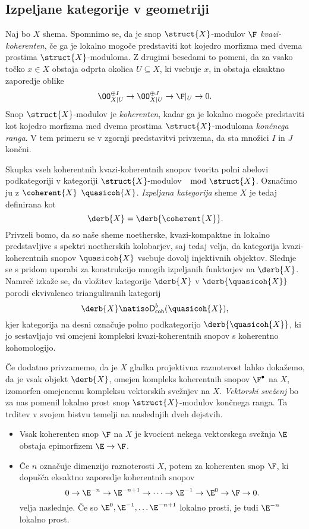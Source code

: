 \subsection*{Izpeljane kategorije v geometriji}

Naj bo $X$ shema. Spomnimo se, da je snop $\struct{X}$-modulov $\F$ \emph{kvazi-koherenten}, če ga je lokalno mogoče predstaviti kot kojedro morfizma med dvema prostima $\struct{X}$-moduloma. Z drugimi besedami to pomeni, da za vsako točko $x \in X$ obstaja odprta okolica $U \subseteq X$, ki vsebuje $x$, in obstaja eksaktno zaporedje oblike 
\[
    \OO_{X|U}^{\oplus I} \to \OO_{X|U}^{\oplus J} \to \F|_U \to 0.
\]
Snop $\struct{X}$-modulov je \emph{koherenten}, kadar ga je lokalno mogoče predstaviti kot kojedro morfizma med dvema prostima $\struct{X}$-moduloma \emph{končnega ranga}. V tem primeru se v zgornji predstavitvi privzema, da sta množici $I$ in $J$ končni.  

Skupka vseh koherentnih \oz kvazi-koherentnih snopov tvorita polni abelovi podkategoriji v kategoriji $\struct{X}$-modulov $\mod{\struct{X}}$. Označimo ju z $\coherent{X}$ \oz $\quasicoh{X}$. \emph{Izpeljana kategorija} sheme $X$ je tedaj definirana kot
\[
    \derb{X} = \derb{\coherent{X}}.
\]   
Privzeli bomo, da so naše sheme noetherske, \tj kvazi-kompaktne in lokalno predstavljive s spektri noetherskih kolobarjev, saj tedaj velja, da kategorija kvazi-koherentnih snopov $\quasicoh{X}$ vsebuje dovolj injektivnih objektov. Slednje se s pridom uporabi za konstrukcijo mnogih izpeljanih funktorjev na $\derb{X}$. Namreč izkaže se, da vložitev kategorije $\derb{X}$ v $\derb{\quasicoh{X}}$ porodi ekvivalenco trianguliranih kategorij 
\[
    \derb{X} \natiso \mathsf{D}^b_{\mathsf{coh}}(\quasicoh{X}),
\]
kjer kategorija na desni označuje polno podkategorijo $\derb{\quasicoh{X}}$, ki jo sestavljajo vsi omejeni kompleksi kvazi-koherentnih snopov s koherentno kohomologijo. 

Če dodatno privzamemo, da je $X$ gladka projektivna raznoterost lahko dokažemo, da je vsak objekt $\derb{X}$, \tj omejen kompleks koherentnih snopov $\F^\bullet$ na $X$, izomorfen omejenemu kompleksu vektorskih svežnjev na $X$. \emph{Vektorski sveženj} bo za nas pomenil lokalno prost snop $\struct{X}$-modulov končnega ranga. Ta trditev v svojem bistvu temelji na naslednjih dveh dejstvih. 

\begin{itemize}[label = $\rhd$]
    \item Vsak koherenten snop $\F$ na $X$ je kvocient nekega vektorskega svežnja $\E$ \tj obstaja epimorfizem $\E \to \F$.
    \item Če $n$ označuje dimenzijo raznoterosti $X$, potem za koherenten snop $\F$, ki dopušča eksaktno zaporedje koherentnih snopov 
    \[
        0 \to \E^{-n} \to \E^{-n+1} \to \cdots \to \E^{-1} \to \E^0 \to \F \to 0.
    \]  
    velja naslednje. Če so $\E^0, \E^{-1}, \dots \E^{-n+1}$ lokalno prosti, je tudi $\E^{-n}$ lokalno prost. 
\end{itemize}

